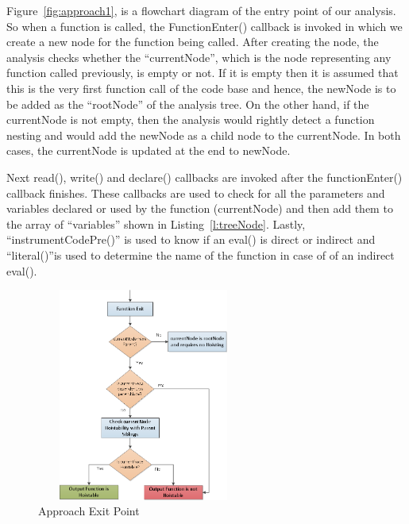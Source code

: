 \documentclass[authoryear,preprint]{sigplanconf}
\begin{document}
Figure~\ref{fig:approach1}, is a flowchart diagram of the entry point of our analysis. So when a function is called, the FunctionEnter() callback is invoked in which we create a new node for the function being called. After creating the node, the analysis checks whether the \enquote{currentNode}, which is the node representing any function called previously, is empty or not. If it is empty then it is assumed that this is the very first function call of the code base and hence, the newNode is to be added as the \enquote{rootNode} of the analysis tree. On the other hand, if the currentNode is not empty, then the analysis would rightly detect a function nesting and would add the newNode as a child node to the currentNode. In both cases, the currentNode is updated at the end to newNode.\par

Next read(), write() and declare() callbacks are invoked after the functionEnter() callback finishes. These callbacks are used to check for all the parameters and variables declared or used by the function (currentNode) and then add them to the array of \enquote{variables} shown in Listing~\ref{l:treeNode}. Lastly, \enquote{instrumentCodePre()} is used to know if an eval() is direct or indirect and \enquote{literal()}is used to determine the name of the function in case of of an indirect eval(). 

\begin{figure}[H]
  \centering
  \includegraphics[width=7cm, height=7cm]{approach2.png}
  \caption{Approach Exit Point}
  \label{fig:approach2}
\end{figure}
\end{document}
